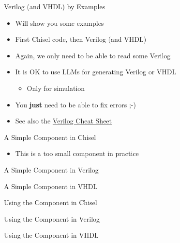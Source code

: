 \begin{frame}[fragile]{Verilog (and VHDL) by Examples}
\begin{itemize}
\item Will show you some examples
\item First Chisel code, then Verilog (and VHDL)
\item Again, we only need to be able to read some Verilog
\item It is OK to use LLMs for generating Verilog or VHDL
\begin{itemize}
\item Only for simulation
\end{itemize}
\item You {\bf just} need to be able to fix errors ;-)
\item See also the \href{https://marceluda.github.io/rp_dummy/EEOF2018/Verilog_Cheat_Sheet.pdf}{Verilog Cheat Sheet}
\end{itemize}
\end{frame}

\begin{frame}[fragile]{A Simple Component in Chisel}
\begin{itemize}
\item This is a too small component in practice
\end{itemize}
\end{frame}


\begin{frame}[fragile]{A Simple Component in Verilog}
\end{frame}

\begin{frame}[fragile]{A Simple Component in VHDL}
\end{frame}

\begin{frame}[fragile]{Using the  Component in Chisel}
\end{frame}

\begin{frame}[fragile]{Using the  Component in Verilog}
\end{frame}

\begin{frame}[fragile]{Using the  Component in VHDL}
\end{frame}

